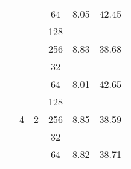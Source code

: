 \begin{longtable}{cccccc}
                      & \cellcolor[HTML]{EFEFEF}{  }                    & \cellcolor[HTML]{EFEFEF}{  }                    & 64                                              & {  8.05}                             & {  42.45}                            \\
                      & \cellcolor[HTML]{EFEFEF}{  }                    & \cellcolor[HTML]{EFEFEF}{  }                    & \cellcolor[HTML]{EFEFEF}128                     & \cellcolor[HTML]{EFEFEF}{  8.13}     & \cellcolor[HTML]{EFEFEF}{  41.99}    \\
                      & \multirow{-4}{*}{\cellcolor[HTML]{EFEFEF}{  2}} & \multirow{-4}{*}{\cellcolor[HTML]{EFEFEF}{  4}} & 256                                             & {  8.83}                             & {  38.68}                            \\ \cline{2-6}
                      & {  }                                            & {  }                                            & \cellcolor[HTML]{EFEFEF}32                      & \cellcolor[HTML]{EFEFEF}{  9.06}     & \cellcolor[HTML]{EFEFEF}{  37.66}    \\
                      & {  }                                            & {  }                                            & 64                                              & {  8.01}                             & {  42.65}                            \\
                      & {  }                                            & {  }                                            & \cellcolor[HTML]{EFEFEF}128                     & \cellcolor[HTML]{EFEFEF}{  8.10}     & \cellcolor[HTML]{EFEFEF}{  42.13}    \\
                      & \multirow{-4}{*}{{  4}}                         & \multirow{-4}{*}{{  2}}                         & 256                                             & {  8.85}                             & {  38.59}                            \\ \cline{2-6}
                      & \cellcolor[HTML]{EFEFEF}{  }                    & \cellcolor[HTML]{EFEFEF}{  }                    & \cellcolor[HTML]{EFEFEF}32                      & \cellcolor[HTML]{EFEFEF}{  9.87}     & \cellcolor[HTML]{EFEFEF}{  34.58}    \\
                      & \cellcolor[HTML]{EFEFEF}{  }                    & \cellcolor[HTML]{EFEFEF}{  }                    & 64                                              & {  8.82}                             & {  38.71}                            \\

\end{longtable}
